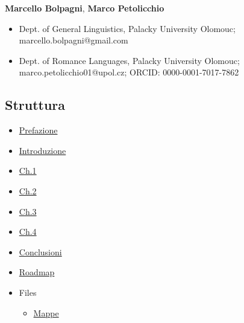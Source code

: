 \textbf{Marcello Bolpagni}, \textbf{Marco Petolicchio}

\begin{itemize}
\tightlist
\item
  Dept. of General Linguistics, Palacky University Olomouc;
  marcello.bolpagni@gmail.com
\item
  Dept. of Romance Languages, Palacky University Olomouc;
  marco.petolicchio01@upol.cz; ORCID: 0000-0001-7017-7862
\end{itemize}

\subsection{Struttura}\label{struttura}

\begin{itemize}
\tightlist
\item
  \href{https://olablit2.github.io/geoBoccaccio/2018-article/05-preface}{Prefazione}
\item
  \href{https://olablit2.github.io/geoBoccaccio/2018-article/10-introduction}{Introduzione}
\item
  \href{https://olablit2.github.io/geoBoccaccio/2018-article/20-chapter1}{Ch.1}
\item
  \href{https://olablit2.github.io/geoBoccaccio/2018-article/30-chapter2}{Ch.2}
\item
  \href{https://olablit2.github.io/geoBoccaccio/2018-article/40-chapter3}{Ch.3}
\item
  \href{https://olablit2.github.io/geoBoccaccio/2018-article/50-chapter4}{Ch.4}
\item
  \href{https://olablit2.github.io/geoBoccaccio/2018-article/90-conclusion}{Conclusioni}
\item
  \href{https://olablit2.github.io/geoBoccaccio/2018-article/99-roadmap}{Roadmap}
\item
  Files

  \begin{itemize}
  \tightlist
  \item
    \href{https://olablit2.github.io/geoBoccaccio/2018-article/95-maps}{Mappe}
  \end{itemize}
\end{itemize}
